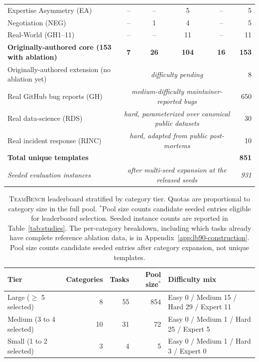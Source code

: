 \documentclass{article}
\begin{document}
\begin{table}[t]
\begin{tabular}{lccccr}
Expertise Asymmetry (EA)         & --  & --  & 5   & --  & 5 \\
Negotiation (NEG)                & --  & 1   & 4   & --  & 5 \\
Real-World (GH1--11)             & --  & --  & 11  & --  & 11 \\
\midrule
\textbf{Originally-authored core (153 with ablation)} & \textbf{7} & \textbf{26} & \textbf{104} & \textbf{16} & \textbf{153} \\
Originally-authored extension (no ablation yet) & \multicolumn{4}{c}{\textit{difficulty pending}}                            & 8   \\
Real GitHub bug reports (GH)               & \multicolumn{4}{c}{\textit{medium-difficulty maintainer-reported bugs}}        & 650 \\
Real data-science (RDS)                    & \multicolumn{4}{c}{\textit{hard, parameterized over canonical public datasets}} & 30  \\
Real incident response (RINC)              & \multicolumn{4}{c}{\textit{hard, adapted from public post-mortems}}            & 10  \\
\midrule
\textbf{Total unique templates}            & \multicolumn{4}{c}{}                                                            & \textbf{851} \\
\textit{Seeded evaluation instances}       & \multicolumn{4}{c}{\textit{after multi-seed expansion at the released seeds}}    & \textit{931} \\
\bottomrule
\end{tabular}
\end{table}


\begin{table}[t]
\centering
\caption{\textsc{TeamBench} leaderboard stratified by category tier. Quotas are proportional to category size in the full pool. $^{\ast}$Pool size counts candidate seeded entries eligible for leaderboard selection. Seeded instance counts are reported in Table~\ref{tab:studies}. The per-category breakdown, including which tasks already have complete reference ablation data, is in Appendix~\ref{app:lb90-construction}. Pool size counts candidate seeded entries after category expansion, not unique templates.}
\label{tab:lb90}
\small
\setlength{\tabcolsep}{8pt}
\begin{tabular}{lrrrl}
\toprule
Tier & Categories & Tasks & Pool size$^{\ast}$ & Difficulty mix \\
\midrule
Large ($\geq$ 5 selected)   & 8  & 55 & 854 & Easy 0 / Medium 15 / Hard 29 / Expert 11 \\
Medium (3 to 4 selected)    & 10 & 31 & 72  & Easy 0 / Medium 1 / Hard 25 / Expert 5  \\
Small (1 to 2 selected)     & 3  & 4  & 5   & Easy 0 / Medium 1 / Hard 3 / Expert 0   \\
\bottomrule
\end{tabular}
\end{table}
\end{document}

